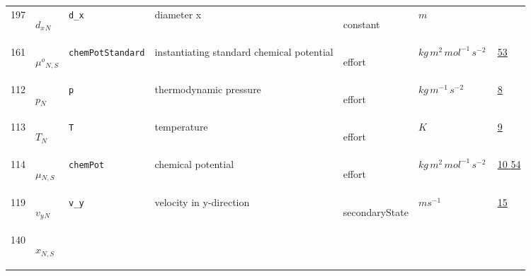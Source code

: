 \begin{longtable}{|p{1cm}|p{2.5cm}|p{4.5cm}|p{8cm}|p{3.0cm}|p{3cm}|p{1cm}|}
                 \\
            197
             & \hypertarget{"v:197"}{ $ {d_x}{_{N}} $}
             & \verb|d_x|
             & diameter x
             & \begin{lay}constant \end{lay}
             & $ m  $
             & \\
            161
             & \hypertarget{"v:161"}{ $ {{\mu^o}}{_{N, S}} $}
             & \verb|chemPotStandard|
             & instantiating standard chemical potential
             & \begin{lay}effort \end{lay}
             & $ kg \,m^{2} \,mol^{-1} \,s^{-2} \, $
             &                 \hyperlink{"e:53"}{ 53 }
                 \\
            112
             & \hypertarget{"v:112"}{ $ {p}{_{N}} $}
             & \verb|p|
             & thermodynamic pressure
             & \begin{lay}effort \end{lay}
             & $ kg \,m^{-1} \,s^{-2} \, $
             &                 \hyperlink{"e:8"}{ 8 }
                 \\
            113
             & \hypertarget{"v:113"}{ $ {T}{_{N}} $}
             & \verb|T|
             & temperature
             & \begin{lay}effort \end{lay}
             & $ K \, $
             &                 \hyperlink{"e:9"}{ 9 }
                 \\
            114
             & \hypertarget{"v:114"}{ $ {{\mu}}{_{N, S}} $}
             & \verb|chemPot|
             & chemical potential
             & \begin{lay}effort \end{lay}
             & $ kg \,m^{2} \,mol^{-1} \,s^{-2} \, $
             &                 \hyperlink{"e:10"}{ 10 }
                                 \hyperlink{"e:54"}{ 54 }
                 \\
            119
             & \hypertarget{"v:119"}{ $ {{v_y}}{_{N}} $}
             & \verb|v_y|
             & velocity in y-direction
             & \begin{lay}secondaryState \end{lay}
             & $ m s^{-1} \, $
             &                 \hyperlink{"e:15"}{ 15 }
                 \\
            140
             & \hypertarget{"v:140"}{ $ {x}{_{N, S}} $}

\end{longtable}
